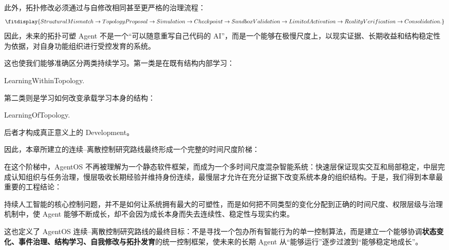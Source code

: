 此外，拓扑修改必须通过与自修改相同甚至更严格的治理流程：
\[
\fitdisplay{
StructuralMismatch
\rightarrow
TopologyProposal
\rightarrow
Simulation
\rightarrow
Checkpoint
\rightarrow
SandboxValidation
\rightarrow
LimitedActivation
\rightarrow
RealityVerification
\rightarrow
Consolidation.
}
\]
因此，未来的拓扑可塑 Agent 不是一个``可以随意重写自己代码的 AI''，而是一个能够在极慢尺度上，以现实证据、长期收益和结构稳定性为依据，对自身功能组织进行受控发育的系统。

这也使我们能够准确区分两类持续学习。第一类是在既有结构内部学习：
\begin{statementbox}
LearningWithinTopology.
\end{statementbox}
第二类则是学习如何改变承载学习本身的结构：
\begin{statementbox}
LearningOfTopology.
\end{statementbox}
后者才构成真正意义上的 Development。

因此，本章所建立的连续--离散控制研究路线最终形成一个完整的时间尺度阶梯：
\begin{statementbox}
\centering
{}
\end{statementbox}

在这个阶梯中，AgentOS 不再被理解为一个静态软件框架，而成为一个多时间尺度混杂智能系统：快速层保证现实交互和局部稳定，中层完成认知组织与任务治理，慢层吸收长期经验并维持身份连续，最慢层才允许在充分证据下改变系统本身的组织结构。于是，我们得到本章最重要的工程结论：

\begin{conclusion}
持续人工智能的核心控制问题，并不是如何让系统拥有最大的可塑性，而是如何把不同类型的变化分配到正确的时间尺度、权限层级与治理机制中，使 Agent 能够不断成长，却不会因为成长本身而失去连续性、稳定性与现实约束。
\end{conclusion}

这也定义了 AgentOS 连续--离散控制研究路线的最终目标：不是寻找一个包办所有智能行为的单一控制算法，而是建立一个能够协调\textbf{状态变化、事件治理、结构学习、自我修改与拓扑发育}的统一控制框架，使未来的长期 Agent 从``能够运行''逐步过渡到``能够稳定地成长''。

